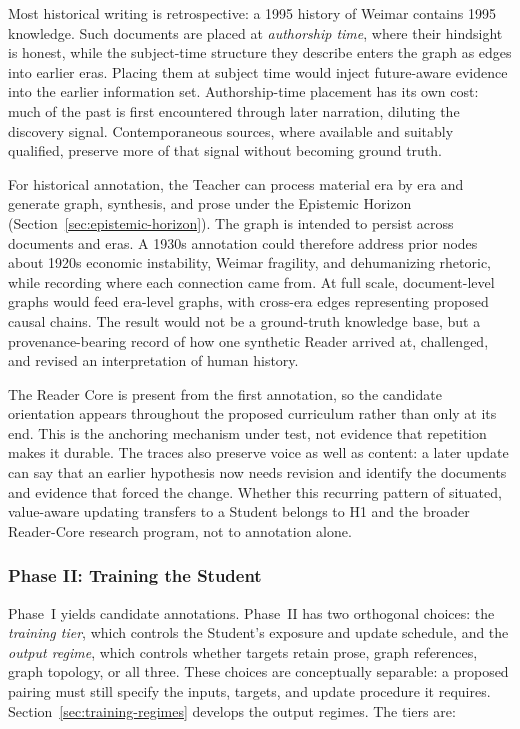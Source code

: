 Most historical writing is retrospective: a 1995 history of Weimar contains
1995 knowledge. Such documents are placed at \emph{authorship time}, where their
hindsight is honest, while the subject-time structure they describe enters the
graph as edges into earlier eras. Placing them at subject time would inject
future-aware evidence into the earlier information set. Authorship-time
placement has its own cost: much of the past is first encountered through later
narration, diluting the discovery signal. Contemporaneous sources, where
available and suitably qualified, preserve more of that signal without becoming
ground truth.

For historical annotation, the Teacher can process material era by era and
generate graph, synthesis, and prose under the Epistemic Horizon
(Section~\ref{sec:epistemic-horizon}). The graph is intended to persist across
documents and eras. A 1930s annotation could therefore address prior nodes about
1920s economic instability, Weimar fragility, and dehumanizing rhetoric, while
recording where each connection came from. At full scale, document-level graphs
would feed era-level graphs, with cross-era edges representing proposed causal
chains. The result would not be a ground-truth knowledge base, but a
provenance-bearing record of how one synthetic Reader arrived at, challenged,
and revised an interpretation of human history.

The Reader Core is present from the first annotation, so the candidate
orientation appears throughout the proposed curriculum rather than only at its
end. This is the anchoring mechanism under test, not evidence that repetition
makes it durable. The traces also preserve voice as well as content: a later
update can say that an earlier hypothesis now needs revision and identify the
documents and evidence that forced the change. Whether this recurring pattern
of situated, value-aware updating transfers to a Student belongs to H1 and
the broader Reader-Core research program, not to annotation alone.

\subsubsection{Phase II: Training the Student}\label{sec:training-phase}

Phase~I yields candidate annotations. Phase~II has two orthogonal choices: the
\emph{training tier}, which controls the Student's exposure and update
schedule, and the
\emph{output regime}, which controls whether targets retain prose, graph
references, graph topology, or all three. These choices are conceptually separable: a proposed pairing must still
specify the inputs, targets, and update procedure it requires.
Section~\ref{sec:training-regimes} develops the output regimes. The tiers are:

